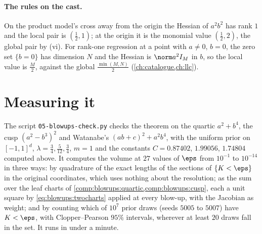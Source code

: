 \begin{refsection}
\paragraph{The rules on the cast.} On the product model's cross away from the origin the Hessian of $a^2b^2$ has rank $1$ and the local pair is $(\frac12,1)$; at the origin it is the monomial value $(\frac12,2)$, the global pair by (vi). For rank-one regression at a point with $a\ne0$, $b=0$, the zero set $\{b=0\}$ has dimension $N$ and the Hessian is $\norm a^2I_M$ in $b$, so the local value is $\frac M2$, against the global $\frac{\min(M,N)}2$ (\cref{ch:catalogue,ch:llc}).

\section{Measuring it}\label{sec:blowups:measuring}

The script \texttt{05-blowups-check.py} checks the theorem on the quartic $a^2+b^4$, the cusp $(a^2-b^3)^2$ and Watanabe's $(ab+c)^2+a^2b^4$, with the uniform prior on $[-1,1]^d$, $\lambda=\frac34,\frac5{12},\frac34$, $m=1$ and the constants $C=0.87402$, $1.99056$, $1.74804$ computed above. It computes the volume at $27$ values of $\eps$ from $10^{-1}$ to $10^{-14}$ in three ways: by quadrature of the exact lengths of the sections of $\{K<\eps\}$ in the original coordinates, which uses nothing about the resolution; as the sum over the leaf charts of \cref{comp:blowups:quartic,comp:blowups:cusp}, each a unit square by \eqref{eq:blowups:twocharts} applied at every blow-up, with the Jacobian as weight; and by counting which of $10^7$ prior draws (seeds $5005$ to $5007$) have $K<\eps$, with Clopper--Pearson $95\%$ intervals, wherever at least $20$ draws fall in the set. It runs in under a minute.


\end{refsection}
